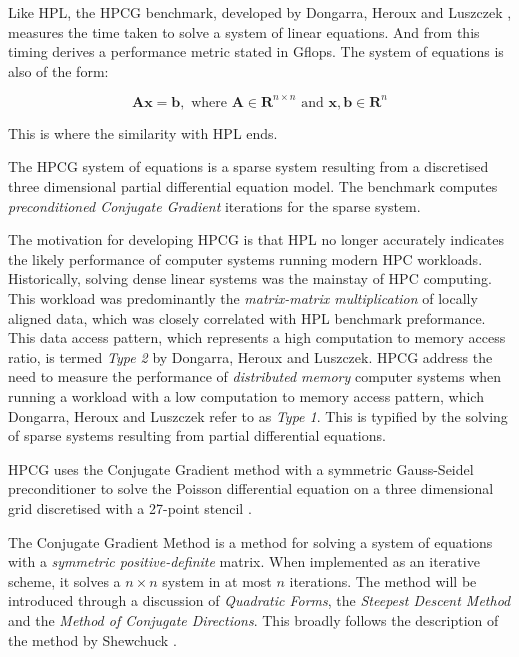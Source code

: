 Like HPL, the HPCG benchmark, developed by Dongarra, Heroux and Luszczek \cite{hpcg-benchmark}, measures the time taken to solve a system of linear equations. And from this timing derives a performance metric stated in Gflops. The system of equations is also of the form:

\begin{equation}
\mathbf{Ax} = \mathbf{b},\text{ where }\mathbf{A} \in \mathbf{R}^{n\times n}\text{ and }\mathbf{x}, \mathbf{b} \in \mathbf{R}^n
\end{equation} 

This is where the similarity with HPL ends.

The HPCG system of equations is a sparse system resulting from a discretised three dimensional partial differential equation model. The benchmark computes \emph{preconditioned Conjugate Gradient} iterations for the sparse system.

The motivation for developing HPCG is that HPL no longer accurately indicates the likely performance of computer systems running modern HPC workloads. Historically, solving dense linear systems was the mainstay of HPC computing. This workload was predominantly the \emph{matrix-matrix multiplication} of locally aligned data, which was closely correlated with HPL benchmark preformance. This data access pattern, which represents a high computation to memory access ratio, is termed \emph{Type 2} by Dongarra, Heroux and Luszczek. HPCG address the need to measure the performance of \emph{distributed memory} computer systems when running a workload with a low computation to memory access pattern, which Dongarra, Heroux and Luszczek refer to as \emph{Type 1}. This is typified by the solving of sparse systems resulting from partial differential equations.

HPCG uses the Conjugate Gradient method with a symmetric Gauss-Seidel preconditioner to solve the Poisson differential equation on a three dimensional grid discretised with a 27-point stencil \cite{hpcg-benchmark}.

The Conjugate Gradient Method is a method for solving a system of equations with a \emph{symmetric positive-definite} matrix. When implemented as an iterative scheme, it solves a $n \times n$ system in at most $n$ iterations. The method will be introduced through a discussion of \emph{Quadratic Forms}, the \emph{Steepest Descent Method} and the \emph{Method of Conjugate Directions}. This broadly follows the description of the method by Shewchuck \cite{cg-without-pain}.

